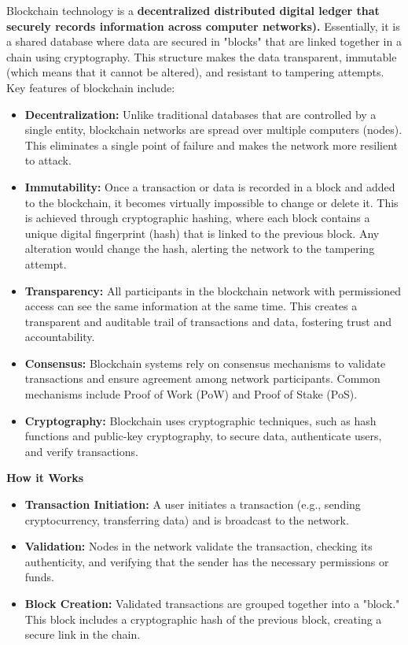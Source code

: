  Blockchain technology is a \textbf{decentralized distributed digital ledger that securely records information across computer networks).} Essentially, it is a shared database where data are secured in "blocks" that are linked together in a chain using cryptography. This structure makes the data transparent, immutable (which means that it cannot be altered), and resistant to tampering attempts. Key features of blockchain include:
\begin{itemize}
    \item \textbf{Decentralization:} Unlike traditional databases that are controlled by a single entity, blockchain networks are spread over multiple computers (nodes). This eliminates a single point of failure and makes the network more resilient to attack.
    \item \textbf{Immutability:} Once a transaction or data is recorded in a block and added to the blockchain, it becomes virtually impossible to change or delete it. This is achieved through cryptographic hashing, where each block contains a unique digital fingerprint (hash) that is linked to the previous block. Any alteration would change the hash, alerting the network to the tampering attempt.
    \item \textbf{Transparency:} All participants in the blockchain network with permissioned access can see the same information at the same time. This creates a transparent and auditable trail of transactions and data, fostering trust and accountability.
    \item \textbf{Consensus:} Blockchain systems rely on consensus mechanisms to validate transactions and ensure agreement among network participants. Common mechanisms include Proof of Work (PoW) and Proof of Stake (PoS).
    \item \textbf{Cryptography:} Blockchain uses cryptographic techniques, such as hash functions and public-key cryptography, to secure data, authenticate users, and verify transactions.
\end{itemize}
\textbf{How it Works}
\begin{itemize}
    \item \textbf{Transaction Initiation:} A user initiates a transaction (e.g., sending cryptocurrency, transferring data) and is broadcast to the network.
    \item \textbf{Validation:} Nodes in the network validate the transaction, checking its authenticity, and verifying that the sender has the necessary permissions or funds.
    \item \textbf{Block Creation:} Validated transactions are grouped together into a "block." This block includes a cryptographic hash of the previous block, creating a secure link in the chain.
\end{itemize}

